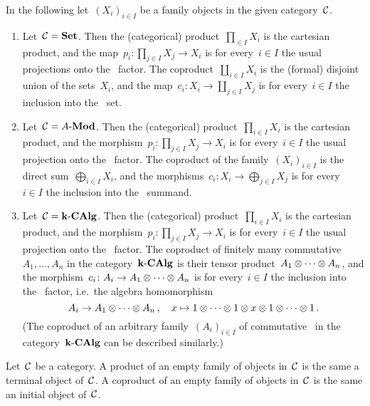 \begin{example}
  In the following let~$(X_i)_{i \in I}$ be a family objects in the given category~$\mathcal{C}$.
  \begin{enumerate}
    \item
      Let~$\mathcal{C} = \mathbf{Set}$.
      Then the (categorical) product~$\prod_{ \in I} X_i$ is the cartesian product, and the map~$p_i \colon \prod_{j \in I} X_j \to X_i$ is for every~$i \in I$ the usual projections onto the~ factor.
      The coproduct~$\coprod_{i \in I} X_i$ is the (formal) disjoint union of the sets~$X_i$, and the map~$c_i \colon X_i \to \coprod_{j \in I} X_j$ is for every~$i \in I$ the inclusion into the~ set.
    \item
      Let~$\mathcal{C} = \text{$A$-$\mathbf{Mod}$}$.
      Then the (categorical) product~$\prod_{i \in I} X_i$ is the cartesian product, and the morphism~$p_i \colon \prod_{j \in I} X_j \to X_i$ is for every~$i \in I$ the usual projection onto the~ factor.
      The coproduct of the family~$(X_i)_{i \in I}$ is the direct sum~$\bigoplus_{i \in I} X_i$, and the morphisms~$c_i \colon X_i \to \bigoplus_{j \in I} X_j$ is for every~$i \in I$ the inclusion into the~ summand.
    \item
      Let~$\mathcal{C} = \text{$\mathbf{k}$-$\mathbf{CAlg}$}$.
      Then the (categorical) product~$\prod_{i \in I} X_i$ is the cartesian product, and the morphism~$p_i \colon \prod_{j \in I} X_j \to X_i$ is for every~$i \in I$ the usual projection onto the~ factor.
      The coproduct of finitely many commutative~{\kalg}~$A_1, \dotsc, A_n$ in the category~$\text{$\mathbf{k}$-$\mathbf{CAlg}$}$ is their tensor product~$A_1 \otimes \dotsb \otimes A_n$, and the morphism~$c_i \colon A_i \to A_1 \otimes \dotsb \otimes A_n$ is for every~$i \in I$ the inclusion into the~ factor, i.e.\ the algebra homomorphism
      \[
                A_i
        \to     A_1 \otimes \dotsb \otimes A_n \,,
        \quad   x
        \mapsto 1 \otimes \dotsb \otimes 1 \otimes x \otimes 1 \otimes \dotsb \otimes 1 \,.
      \]
      (The coproduct of an arbitrary family~$(A_i)_{i \in I}$ of commutative~{\kalgs} in the category~$\text{$\mathbf{k}$-$\mathbf{CAlg}$}$ can be described similarly.)
  \end{enumerate}
\end{example}


\begin{remark*}
  Let~$\mathcal{C}$ be a category.
  A product of an empty family of objects in~$\mathcal{C}$ is the same a terminal object of~$\mathcal{C}$.
  A coproduct of an empty family of objects in~$\mathcal{C}$ is the same an initial object of~$\mathcal{C}$.
\end{remark*}


